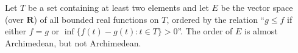 Let $T$ be a set containing at least two elements and let $E$ be the vector space (over $\mathbf{R}$) of all bounded real functions on $T$, ordered by the relation ``$g \leq f$ if either $f = g$ or $\inf\{f(t) - g(t): t \in T\} > 0$''. The order of $E$ is almost Archimedean, but not Archimedean.
